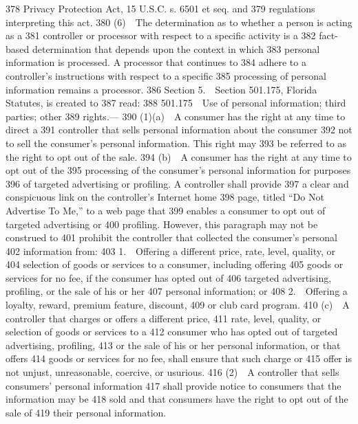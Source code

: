   378  Privacy Protection Act, 15 U.S.C. s. 6501 et seq. and
  379  regulations interpreting this act.
  380         (6) The determination as to whether a person is acting as a
  381  controller or processor with respect to a specific activity is a
  382  fact-based determination that depends upon the context in which
  383  personal information is processed. A processor that continues to
  384  adhere to a controller’s instructions with respect to a specific
  385  processing of personal information remains a processor.
  386         Section 5. Section 501.175, Florida Statutes, is created to
  387  read:
  388         501.175 Use of personal information; third parties; other
  389  rights.—
  390         (1)(a) A consumer has the right at any time to direct a
  391  controller that sells personal information about the consumer
  392  not to sell the consumer’s personal information. This right may
  393  be referred to as the right to opt out of the sale.
  394         (b) A consumer has the right at any time to opt out of the
  395  processing of the consumer’s personal information for purposes
  396  of targeted advertising or profiling. A controller shall provide
  397  a clear and conspicuous link on the controller’s Internet home
  398  page, titled “Do Not Advertise To Me,” to a web page that
  399  enables a consumer to opt out of targeted advertising or
  400  profiling. However, this paragraph may not be construed to
  401  prohibit the controller that collected the consumer’s personal
  402  information from:
  403         1. Offering a different price, rate, level, quality, or
  404  selection of goods or services to a consumer, including offering
  405  goods or services for no fee, if the consumer has opted out of
  406  targeted advertising, profiling, or the sale of his or her
  407  personal information; or
  408         2. Offering a loyalty, reward, premium feature, discount,
  409  or club card program.
  410         (c) A controller that charges or offers a different price,
  411  rate, level, quality, or selection of goods or services to a
  412  consumer who has opted out of targeted advertising, profiling,
  413  or the sale of his or her personal information, or that offers
  414  goods or services for no fee, shall ensure that such charge or
  415  offer is not unjust, unreasonable, coercive, or usurious.
  416         (2) A controller that sells consumers’ personal information
  417  shall provide notice to consumers that the information may be
  418  sold and that consumers have the right to opt out of the sale of
  419  their personal information.
